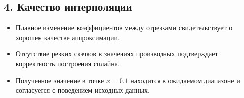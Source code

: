 \subsection*{4. Качество интерполяции}
\begin{itemize}
\item Плавное изменение коэффициентов между отрезками свидетельствует о хорошем качестве аппроксимации.
\item Отсутствие резких скачков в значениях производных подтверждает корректность построения сплайна.
\item Полученное значение в точке \( x = 0.1 \) находится в ожидаемом диапазоне и согласуется с поведением исходных данных.
\end{itemize}

\pagebreak
